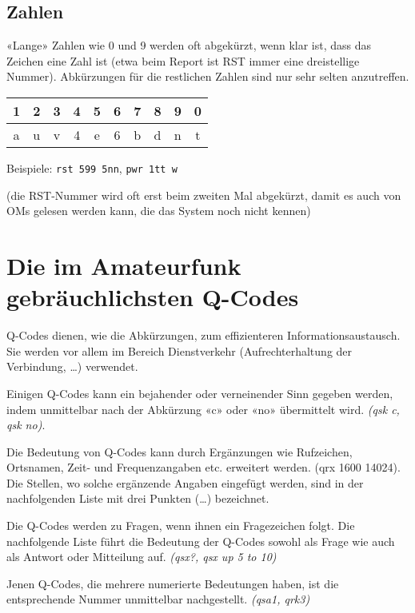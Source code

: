 \subsection{Zahlen}
«Lange» Zahlen wie 0 und 9 werden oft abgekürzt, wenn klar ist, dass das Zeichen eine Zahl ist (etwa beim Report ist RST immer eine dreistellige Nummer). Abkürzungen für die restlichen Zahlen sind nur sehr selten anzutreffen.

\vspace{1em}
{
\begin{tabular}{cccccccccc}
1 & 2 & 3 & 4 & 5 & 6 & 7 & 8 & 9 & 0 \\
\toprule
a & u & v & 4 & e & 6 & b & d & n & t
\end{tabular}
}
\vspace{1em}

Beispiele: \texttt{rst 599 5nn}, \texttt{pwr 1tt w}

(die RST-Nummer wird oft erst beim zweiten Mal abgekürzt, damit es auch von OMs gelesen werden kann, die das System noch nicht kennen)

\section{Die im Amateurfunk gebräuchlichsten Q-Codes}
Q-Codes dienen, wie die Abkürzungen, zum effizienteren Informationsaustausch. Sie werden vor allem im Bereich Dienstverkehr (Aufrechterhaltung der Verbindung, …) verwendet.

Einigen Q-Codes kann ein bejahender oder verneinender Sinn gegeben werden, indem unmittelbar nach der Abkürzung «c» oder «no» übermittelt wird. \textit{(qsk c, qsk no)}.

Die Bedeutung von Q-Codes kann durch Ergänzungen wie Rufzeichen, Ortsnamen, Zeit- und Frequenzangaben etc. erweitert werden. (qrx 1600 14024). Die Stellen, wo solche ergänzende Angaben eingefügt werden, sind in der nachfolgenden Liste mit drei Punkten (…) bezeichnet. 

Die Q-Codes werden zu Fragen, wenn ihnen ein Fragezeichen folgt. Die nachfolgende Liste führt die Bedeutung der Q-Codes sowohl als Frage wie auch als Antwort oder Mitteilung auf. \textit{(qsx?, qsx up 5 to 10)}

Jenen Q-Codes, die mehrere numerierte Bedeutungen haben, ist die entsprechende Nummer unmittelbar nachgestellt. \textit{(qsa1, qrk3)}

